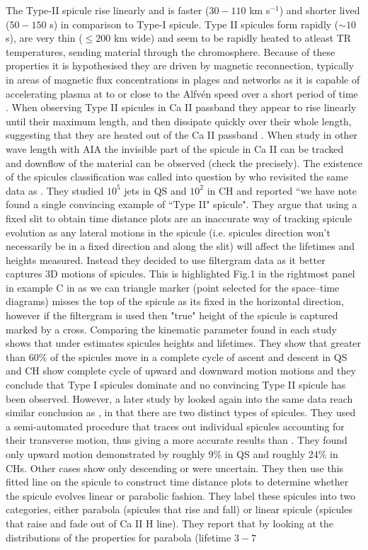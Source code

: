 \documentclass[12pt]{ociamthesis}
\newcommand{\Alfven}{Alfv\'{e}n }
\begin{document}
The Type-II spicule rise linearly and is faster ($30-110$ km s$^{-1}$) and shorter lived ($50-150$ s) in comparison to Type-I spicule. Type II spicules form rapidly ($\sim 10$ s), are very thin ($\leq 200$ km wide) and seem to be rapidly heated to atleast TR temperatures, sending material through the chromosphere. Because of these properties it is hypothesised they are driven by magnetic reconnection,  typically in areas of magnetic flux concentrations in plages and networks as it is capable of accelerating plasma at to or close to the \Alfven speed over a short period of time \citep{Pontieu2007PASJ}. When observing Type II spicules in Ca II passband they appear to rise linearly until their maximum length, and then dissipate quickly over their whole length, suggesting that they are heated out of the Ca II passband \citep{Pereira2012}. When study in other wave length with AIA the invisible part of the spicule in Ca II can be tracked and downflow of the material can be observed (check the precisely). The existence of the spicules classification was called into question by \cite{Zhang2012ApJ} who revisited the same data as \cite{Pontieu2007PASJ}. They studied $10^5$ jets in QS and $10^2$ in CH and reported ``we have note found a single convincing example of ``Type II" spicule". They argue that using a fixed slit to obtain time distance plots are an inaccurate way of tracking spicule evolution as any lateral motions in the spicule (i.e. spicules direction won't necessarily be in a fixed direction and along the slit) will affect the lifetimes and heights measured. Instead they decided to use filtergram data as it better captures 3D motions of spicules. This is highlighted Fig.1 in the rightmost panel in example C in \cite{Zhang2012ApJ} as we can triangle marker (point selected for the space–time diagrams) misses the top of the spicule as its fixed in the horizontal direction, however if the filtergram is used then "true" height of the spicule is captured marked by a cross. Comparing the kinematic parameter found in each study \cite{Zhang2012ApJ} shows that \cite{Pontieu2007PASJ} under estimates spicules heights and lifetimes. They show that greater than 60\% of the spicules move in a complete cycle of ascent and descent in QS and CH show complete cycle of upward and downward motion motions and they conclude that Type I spicules dominate and no convincing Type II spicule has been observed. However, a later study by \cite{Pereira2012} looked again into the same data reach similar conclusion as \cite{Pontieu2007PASJ}, in that there are two distinct types of spicules. They used a semi-automated procedure that traces out individual spicules accounting for their transverse motion, thus giving a more accurate results than \cite{Pontieu2007PASJ}. They found only upward motion demonstrated by roughly 9\% in QS and roughly 24\% in CHs. Other cases show only descending or were uncertain. They then use this fitted line on the spicule to construct time distance plots to determine whether the spicule evolves linear or parabolic fashion. They label these spicules into two categories, either parabola (spicules that rise and fall) or linear spicule (spicules that raise and fade out of Ca II H line). They report that by looking at the distributions of the properties for parabola (lifetime $3-7$ 
\end{document}

